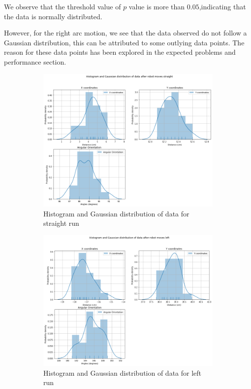 \documentclass[10pt,a4paper]{article}
\begin{document}
			We observe that the threshold value of $p$ value is more than $0.05$,indicating that the data is normally distributed.
			
			However, for the right arc motion, we see that the data observed do not follow a Gaussian distribution, this can be attributed to some outlying data points. The reason for these data points has been explored in the expected problems and performance section.
			
			 \begin{figure}[H]
			 	\begin{subfigure}{\textwidth}
			 		\centering
			 		\includegraphics[width=\linewidth]{img/histplot_st.png}
			 		\caption{Histogram and Gaussian distribution of data for straight run}
			 	\end{subfigure}
			 	\caption{}%
			 \end{figure}
			 \begin{figure}[H]
			 	\begin{subfigure}{\textwidth}
			 		\centering
			 		\includegraphics[width=\linewidth]{img/histplot_lt.png}
			 		\caption{Histogram and Gaussian distribution of data for left run}
			 	\end{subfigure}
			 	\caption{}%
			\end{figure}
\end{document}
